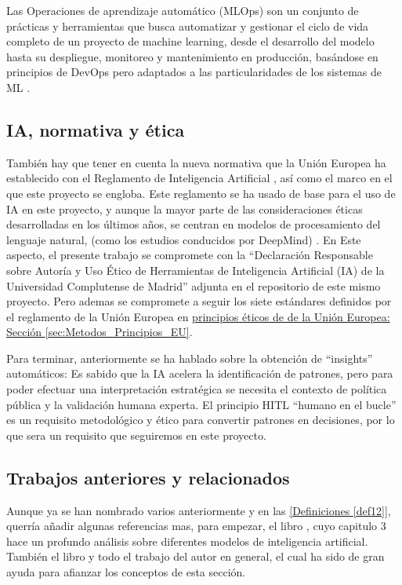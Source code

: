 Las Operaciones de aprendizaje automático (MLOps) son un conjunto de prácticas y herramientas que busca automatizar y gestionar el ciclo de vida completo de un proyecto de machine learning, desde el desarrollo del modelo hasta su despliegue, monitoreo y mantenimiento en producción, basándose en principios de DevOps pero adaptados a las particularidades de los sistemas de ML \citep{Kreuzberger2023MLOps}.

\subsection{IA, normativa y ética}

También hay que tener en cuenta la nueva normativa que la Unión Europea ha establecido con el Reglamento de Inteligencia Artificial \citep{webRIA2024Europa}, así como el marco en el que este proyecto se engloba. Este reglamento se ha usado de base para el uso de IA en este proyecto, y aunque la mayor parte de las consideraciones éticas desarrolladas en los últimos años, se centran en modelos de procesamiento del lenguaje natural, (como los estudios conducidos por DeepMind) \citep{gabriel2024ethicsadvancedaiassistants}. En Este aspecto, el presente trabajo se compromete con la ``Declaración Responsable sobre Autoría y Uso Ético de Herramientas de Inteligencia Artificial (IA) de la Universidad Complutense de Madrid'' adjunta en el repositorio de este mismo proyecto. Pero ademas se compromete a seguir los siete estándares definidos por el reglamento de la Unión Europea en \hyperref[sec:Metodos_Principios_EU]{principios éticos de de la Unión Europea: Sección \ref*{sec:Metodos_Principios_EU}}.

Para terminar, anteriormente se ha hablado sobre la obtención de ``insights'' automáticos: Es sabido que la IA acelera la identificación de patrones, pero para poder efectuar una interpretación estratégica se necesita el contexto de política pública y la validación humana experta. El principio HITL ``humano en el bucle'' \citep{MosqueiraRey2023} es un requisito metodológico y ético para convertir patrones en decisiones, por lo que sera un requisito que seguiremos en este proyecto.


\subsection{Trabajos anteriores y relacionados}
	
	Aunque ya se han nombrado varios anteriormente y en las \hyperref[def12]{[Definiciones \ref*{def12}]}, querría añadir algunas referencias mas, para empezar, el libro \citep{Fowdur2021}, cuyo capitulo 3 hace un profundo análisis sobre diferentes modelos de inteligencia artificial. También el libro \citep{Brownlee_2016_MMLA} y todo el trabajo del autor en general, el cual ha sido de gran ayuda para afianzar los conceptos de esta sección.

